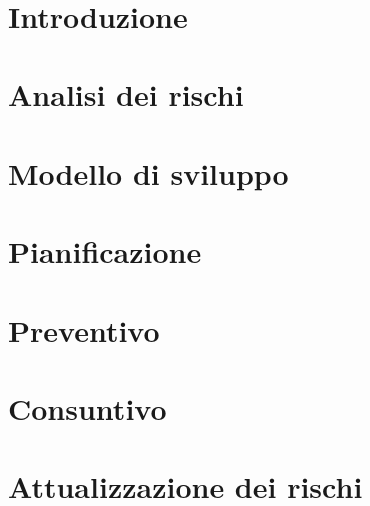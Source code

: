 \documentclass[12pt, a4paper,table]{article}
\title{\textsc{\docNome}}
\author{}
\date{}
\begin{document}


\tableofcontents
\newpage
\section{Introduzione}
    
\section{Analisi dei rischi}
      
\section{Modello di sviluppo}
      
\section{Pianificazione}
      
      
      
      
\section{Preventivo}
      
      
      
\section{Consuntivo}
      
      \newpage
\section{Attualizzazione dei rischi}
      
\end{document}
